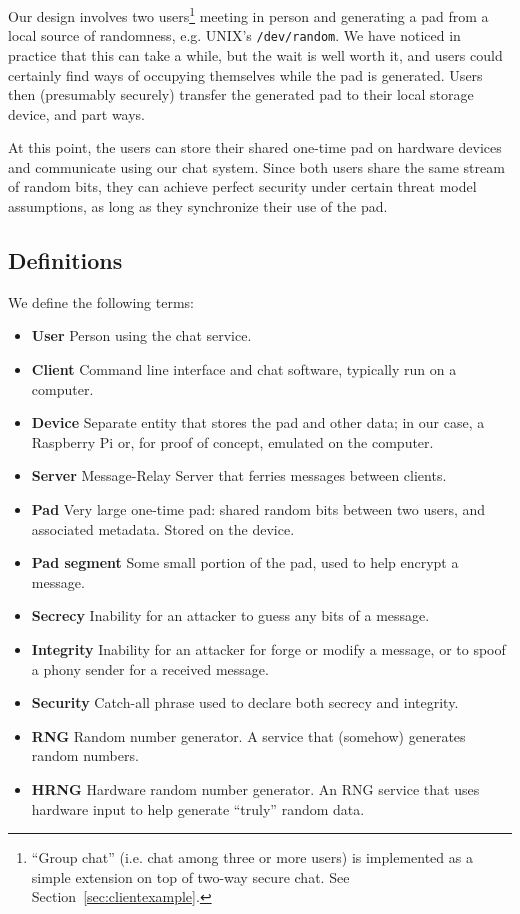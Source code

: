 \documentclass[twocolumn]{article}
\begin{document}
Our design involves two users\footnote{
``Group chat'' (i.e. chat among three or more users) is implemented as a simple extension on top of two-way secure chat. See Section~\ref{sec:clientexample}.
}
meeting in person and generating a pad from a local source of randomness, e.g. UNIX's \texttt{/dev/random}. We have noticed in practice that this can take a while, but the wait is well worth it, and users could certainly find ways of occupying themselves while the pad is generated. Users then (presumably securely) transfer the generated pad to their local storage device, and part ways.

At this point, the users can store their shared one-time pad on hardware devices and communicate using our chat system. Since both users share the same stream of random bits, they can achieve perfect security under certain threat model assumptions, as long as they synchronize their use of the pad.

\subsection{Definitions}
We define the following terms:
\begin{itemize} \itemsep0em 
  \item \textbf{User} Person using the chat service.
  \item \textbf{Client} Command line interface and chat software, typically run on a computer.
  \item \textbf{Device} Separate entity that stores the pad and other data; in our case, a Raspberry Pi or, for proof of concept, emulated on the computer.
  \item \textbf{Server} Message-Relay Server that ferries messages between clients.
  \item \textbf{Pad} Very large one-time pad: shared random bits between two users, and associated metadata. Stored on the device.
  \item \textbf{Pad segment} Some small portion of the pad, used to help encrypt a message.
  \item \textbf{Secrecy} Inability for an attacker to guess any bits of a message.
  \item \textbf{Integrity} Inability for an attacker for forge or modify a message, or to spoof a phony sender for a received message.
  \item \textbf{Security} Catch-all phrase used to declare both secrecy and integrity.
  \item \textbf{RNG} Random number generator. A service that (somehow) generates random numbers.
  \item \textbf{HRNG} Hardware random number generator. An RNG service that uses hardware input to help generate ``truly'' random data.
\end{itemize}
\end{document}
